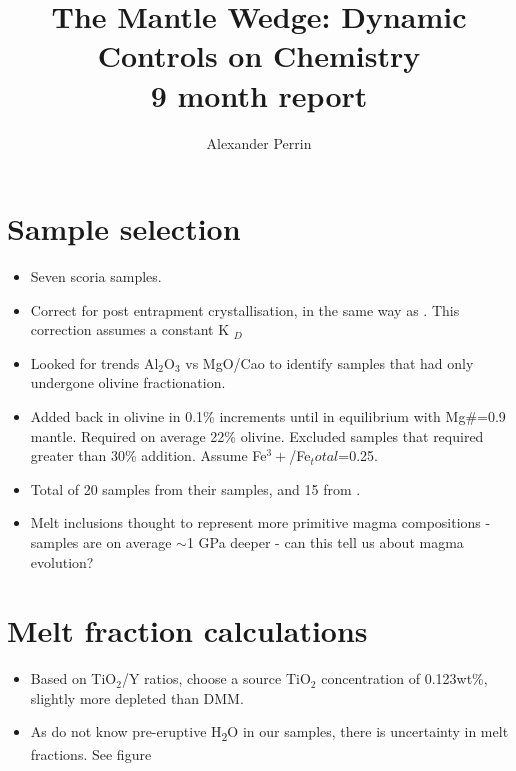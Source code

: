 \documentclass{scrartcl}
\title{The Mantle Wedge: Dynamic Controls on Chemistry\\ 9 month report}
\author{Alexander Perrin}
\begin{document}
\section{Sample selection}
\begin{itemize}
\item Seven scoria samples.
\item Correct for post entrapment crystallisation, in the same way as . This correction assumes a constant K $_{D}$
\item Looked for trends Al$_2$O$_3$ vs MgO/Cao to identify samples that had only undergone olivine fractionation.
\item Added back in olivine in 0.1\% increments until in equilibrium with Mg\#=0.9 mantle. Required on average 22\% olivine. Excluded samples that required greater than 30\% addition. Assume Fe$^3+$/Fe$_total$=0.25.
\item Total of 20 samples from their samples, and 15 from \cite{shaw2008hydrogen}.
\item Melt inclusions thought to represent more primitive magma compositions \cite{schiano2003primitive} - \cite{kelley2010mantle} samples are on average $\sim$1 GPa deeper - can this tell us about magma evolution?
\end{itemize}

\section{Melt fraction calculations}
\begin{itemize}
\item Based on TiO$_2$/Y ratios, choose a source TiO$_2$ concentration of 0.123wt\%, slightly more depleted than DMM.
\item As do not know pre-eruptive H\textsubscript{2}O in our samples, there is uncertainty in melt fractions. See figure 
\end{itemize}
\end{document}
